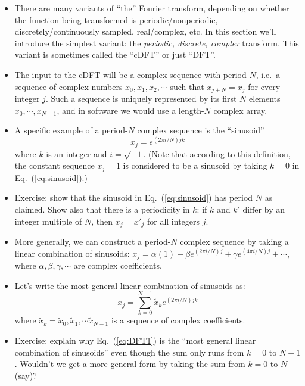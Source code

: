\documentclass[aps,prd,superscriptaddress,groupedaddress,nofootinbib,nobibnotes]{revtex4}
\newcommand{\be}{\begin{equation}}
\newcommand{\ee}{\end{equation}}
\def\tx{{\tilde x}}
\begin{document}
\begin{itemize}

\item There are many variants of ``the'' Fourier transform, depending on whether the function
 being transformed is periodic/nonperiodic, discretely/continuously sampled, real/complex, etc.
 In this section we'll introduce the simplest variant: the {\em periodic, discrete, complex} transform.
 This variant is sometimes called the ``cDFT'' or just ``DFT''.

\item The input to the cDFT will be a complex sequence with period $N$, i.e.~a sequence of
 complex numbers $x_0, x_1, x_2, \cdots$ such that $x_{j+N} = x_j$ for every integer $j$.
 Such a sequence is uniquely represented by its first $N$ elements $x_0, \cdots, x_{N-1}$,
 and in software we would use a length-$N$ complex array.

\item A specific example of a period-$N$ complex sequence is the ``sinusoid''
\be
 x_j = e^{(2\pi i / N) j k}   \label{eq:sinusoid}
\ee
 where $k$ is an integer and $i=\sqrt{-1}$.  (Note that according to this definition, the
 constant sequence $x_j = 1$ is considered to be a sinusoid by taking $k=0$ in Eq.~(\ref{eq:sinusoid}).)

\item Exercise: show that the sinusoid in Eq.~(\ref{eq:sinusoid}) has period $N$ as claimed.
 Show also that there is a periodicity in $k$: if $k$ and $k'$ differ by an integer multiple of $N$,
 then $x_j = x'_j$ for all integers $j$.

\item More generally, we can construct a period-$N$ complex sequence by taking a linear combination
 of sinusoids: $x_j = \alpha (1) + \beta e^{(2\pi i/N) j} + \gamma e^{(4\pi i/N) j} + \cdots$,
 where $\alpha, \beta, \gamma, \cdots$ are complex coefficients.

\item Let's write the most general linear combination of sinusoids as:
\be
 x_j = \sum_{k=0}^{N-1} \tx_k e^{(2\pi i / N) j k}  \label{eq:DFT1}
\ee
 where $\tx_k = \tx_0, \tx_1, \cdots \tx_{N-1}$ is a sequence of complex coefficients.
\item Exercise: explain why Eq.~(\ref{eq:DFT1}) is the ``most general linear combination of sinusoids''
 even though the sum only runs from $k=0$ to $N-1$.  Wouldn't we get a more general form by taking
 the sum from $k=0$ to $N$ (say)?


\end{itemize}
\end{document}
